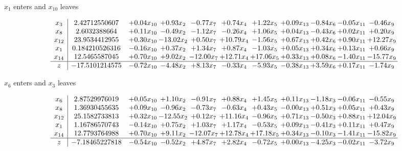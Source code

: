 \documentclass[9pt]{article}
\begin{document}
 $ x_{1} $ enters and $ x_{10} $ leaves 

 \[\begin{array}{c| c c@{\hskip 2pt} c@{\hskip 2pt} c@{\hskip 2pt} c@{\hskip 2pt} c@{\hskip 2pt} c@{\hskip 2pt} c@{\hskip 2pt} c@{\hskip 2pt} c@{\hskip 2pt} }
 x_{3}   &  2.42712550607 & +  0.04 x_{10} & +  0.93 x_{2} & -0.77 x_{7} & +  0.74 x_{4} & +  1.22 x_{5} & +  0.09 x_{13} & -0.84 x_{6} & -0.05 x_{11} & -0.46 x_{9}\\
 x_{8}   &  2.6032388664 & +  0.11 x_{10} & -0.49 x_{2} & -1.12 x_{7} & -0.26 x_{4} & +  1.06 x_{5} & +  0.04 x_{13} & -0.43 x_{6} & +  0.02 x_{11} & +  0.20 x_{9}\\
 x_{12}   &  23.9534412955 & +  0.30 x_{10} & -13.02 x_{2} & +  0.50 x_{7} & + 10.79 x_{4} & -1.56 x_{5} & +  0.67 x_{13} & +  0.42 x_{6} & +  0.90 x_{11} & + 12.27 x_{9}\\
 x_{1}   &  0.184210526316 & -0.16 x_{10} & +  0.37 x_{2} & +  1.34 x_{7} & +  0.87 x_{4} & -1.03 x_{5} & +  0.05 x_{13} & +  0.34 x_{6} & +  0.13 x_{11} & +  0.66 x_{9}\\
 x_{14}   &  12.5465587045 & +  0.70 x_{10} & +  9.02 x_{2} & -12.00 x_{7} & + 12.71 x_{4} & + 17.06 x_{5} & +  0.33 x_{13} & +  0.08 x_{6} & -1.40 x_{11} & -15.77 x_{9}\\
\hline
z    &  -17.5101214575 & -0.72 x_{10} & -4.48 x_{2} & +  8.13 x_{7} & -0.33 x_{4} & -5.93 x_{5} & -0.38 x_{13} & +  3.59 x_{6} & +  0.17 x_{11} & -1.74 x_{9}\\
\end{array}\]


 $ x_{6} $ enters and $ x_{3} $ leaves 

 \[\begin{array}{c| c c@{\hskip 2pt} c@{\hskip 2pt} c@{\hskip 2pt} c@{\hskip 2pt} c@{\hskip 2pt} c@{\hskip 2pt} c@{\hskip 2pt} c@{\hskip 2pt} c@{\hskip 2pt} }
 x_{6}   &  2.87529976019 & +  0.05 x_{10} & +  1.10 x_{2} & -0.91 x_{7} & +  0.88 x_{4} & +  1.45 x_{5} & +  0.11 x_{13} & -1.18 x_{3} & -0.06 x_{11} & -0.55 x_{9}\\
 x_{8}   &  1.36930455635 & +  0.09 x_{10} & -0.96 x_{2} & -0.73 x_{7} & -0.63 x_{4} & +  0.43 x_{5} & -0.00 x_{13} & +  0.51 x_{3} & +  0.05 x_{11} & +  0.43 x_{9}\\
 x_{12}   &  25.1582733813 & +  0.32 x_{10} & -12.55 x_{2} & +  0.12 x_{7} & + 11.16 x_{4} & -0.96 x_{5} & +  0.71 x_{13} & -0.50 x_{3} & +  0.88 x_{11} & + 12.04 x_{9}\\
 x_{1}   &  1.16786570743 & -0.14 x_{10} & +  0.75 x_{2} & +  1.03 x_{7} & +  1.17 x_{4} & -0.53 x_{5} & +  0.09 x_{13} & -0.41 x_{3} & +  0.11 x_{11} & +  0.47 x_{9}\\
 x_{14}   &  12.7793764988 & +  0.70 x_{10} & +  9.11 x_{2} & -12.07 x_{7} & + 12.78 x_{4} & + 17.18 x_{5} & +  0.34 x_{13} & -0.10 x_{3} & -1.41 x_{11} & -15.82 x_{9}\\
\hline
z    &  -7.18465227818 & -0.54 x_{10} & -0.52 x_{2} & +  4.87 x_{7} & +  2.82 x_{4} & -0.72 x_{5} & +  0.00 x_{13} & -4.25 x_{3} & -0.02 x_{11} & -3.72 x_{9}\\
\end{array}\]
\end{document}
